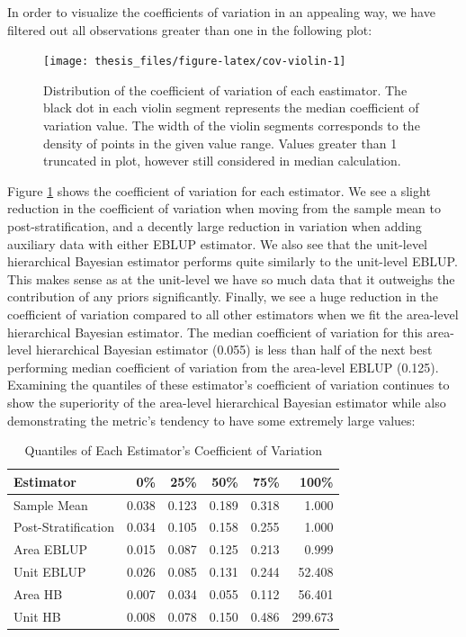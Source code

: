 \documentclass[12pt,twoside]{reedthesis}
\begin{document}
In order to visualize the coefficients of variation in an appealing way, we have filtered out all observations greater than one in the following plot:
\begin{figure}

{\centering \texttt{[image: thesis\_files/figure-latex/cov-violin-1]} 

}

\caption[Distribution of the coefficient of variation of each eastimator]{Distribution of the coefficient of variation of each eastimator. The black dot in each violin segment represents the median coefficient of variation value. The width of the violin segments corresponds to the density of points in the given value range. Values greater than 1 truncated in plot, however still considered in median calculation.}\label{fig:cov-violin}
\end{figure}
Figure \ref{fig:cov-violin} shows the coefficient of variation for each estimator. We see a slight reduction in the coefficient of variation when moving from the sample mean to post-stratification, and a decently large reduction in variation when adding auxiliary data with either EBLUP estimator. We also see that the unit-level hierarchical Bayesian estimator performs quite similarly to the unit-level EBLUP. This makes sense as at the unit-level we have so much data that it outweighs the contribution of any priors significantly. Finally, we see a huge reduction in the coefficient of variation compared to all other estimators when we fit the area-level hierarchical Bayesian estimator. The median coefficient of variation for this area-level hierarchical Bayesian estimator (0.055) is less than half of the next best performing median coefficient of variation from the area-level EBLUP (0.125). Examining the quantiles of these estimator's coefficient of variation continues to show the superiority of the area-level hierarchical Bayesian estimator while also demonstrating the metric's tendency to have some extremely large values:
\begin{longtable}[t]{lrrrrr}
\caption[Coefficient of Variation Quantiles]{\label{tab:quantile-table}Quantiles of Each Estimator's Coefficient of Variation}\\
\toprule
Estimator & 0\% & 25\% & 50\% & 75\% & 100\%\\
\midrule
Sample Mean & 0.038 & 0.123 & 0.189 & 0.318 & 1.000\\
Post-Stratification & 0.034 & 0.105 & 0.158 & 0.255 & 1.000\\
Area EBLUP & 0.015 & 0.087 & 0.125 & 0.213 & 0.999\\
Unit EBLUP & 0.026 & 0.085 & 0.131 & 0.244 & 52.408\\
Area HB & 0.007 & 0.034 & 0.055 & 0.112 & 56.401\\
\addlinespace
Unit HB & 0.008 & 0.078 & 0.150 & 0.486 & 299.673\\
\bottomrule
\end{longtable}
\end{document}
